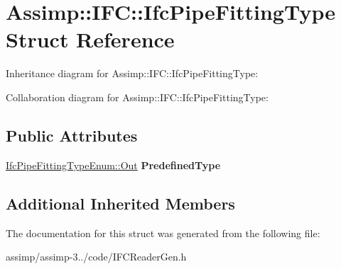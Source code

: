 \hypertarget{struct_assimp_1_1_i_f_c_1_1_ifc_pipe_fitting_type}{\section{Assimp\+:\+:I\+F\+C\+:\+:Ifc\+Pipe\+Fitting\+Type Struct Reference}
\label{struct_assimp_1_1_i_f_c_1_1_ifc_pipe_fitting_type}
}


Inheritance diagram for Assimp\+:\+:I\+F\+C\+:\+:Ifc\+Pipe\+Fitting\+Type\+:


Collaboration diagram for Assimp\+:\+:I\+F\+C\+:\+:Ifc\+Pipe\+Fitting\+Type\+:
\subsection*{Public Attributes}
\begin{DoxyCompactItemize}
\item 
\hypertarget{struct_assimp_1_1_i_f_c_1_1_ifc_pipe_fitting_type_a3ce94b70f0d559b783ba4acaa66b036d}{\hyperlink{classboost_1_1shared__ptr}{Ifc\+Pipe\+Fitting\+Type\+Enum\+::\+Out} {\bfseries Predefined\+Type}}\label{struct_assimp_1_1_i_f_c_1_1_ifc_pipe_fitting_type_a3ce94b70f0d559b783ba4acaa66b036d}

\end{DoxyCompactItemize}
\subsection*{Additional Inherited Members}


The documentation for this struct was generated from the following file\+:\begin{DoxyCompactItemize}
\item 
assimp/assimp-\/3../code/I\+F\+C\+Reader\+Gen.\+h\end{DoxyCompactItemize}
